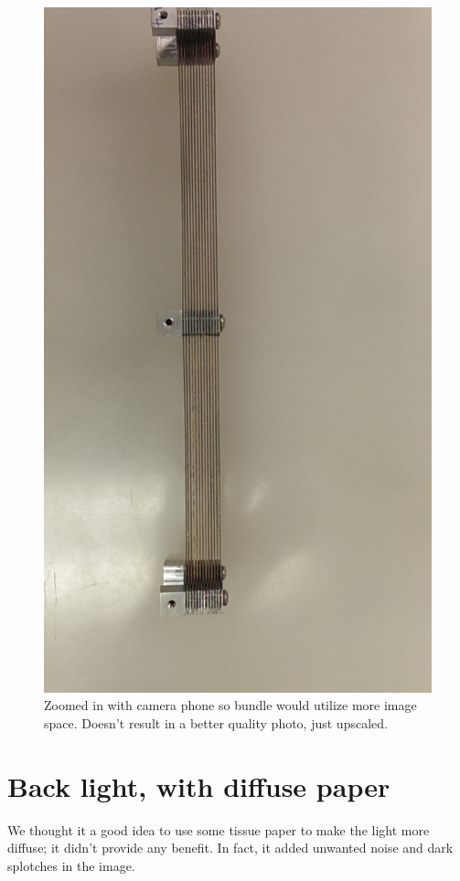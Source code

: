 \documentclass[10pt]{scrartcl}
\begin{document}
\begin{figure}[!ht]
    \centering
    \includegraphics[width=.7\textwidth]{../plots_tables_images/slats/IMAG0150.jpg}    
    \caption{Zoomed in with camera phone so bundle would utilize more image space. Doesn't result in a better quality photo, just upscaled.}
\end{figure}

\clearpage
\section{Back light, with diffuse paper} %
\label{sec:with_diffuse_paper}
We thought it a good idea to use some tissue paper to make the light more diffuse; it didn't provide any benefit. In fact, it added unwanted noise and dark splotches in the image. 
\end{document}
